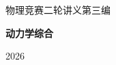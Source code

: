 \documentclass[11pt,openany,fontset=fandol]{ctexbook}
\theoremstyle{definition}\newtheorem{example}{例}[chapter]\newtheorem{exercise}{习题}[chapter]
\begin{document}
\frontmatter
\begin{titlepage}
\centering\vspace*{30mm}
{\Large 物理竞赛二轮讲义\quad 第三编\par}\vspace{8mm}

{\Huge\bfseries 动力学综合\par}
\vspace{12mm}{\Large 物理竞赛二轮讲义\par}
\vspace{10mm}{\large 第一讲至第八讲\par}
\vfill{\large 2026\par}
\end{titlepage}

\begingroup\small\setlength{\parskip}{0pt}\linespread{1}\selectfont\tableofcontents\endgroup\let\cleardoublepage\clearpage\mainmatter








\end{document}
